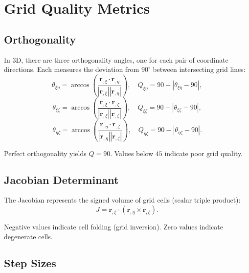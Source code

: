 \documentclass[11pt,a4paper]{report}
\newcommand{\rvec}{\bm{r}}
\begin{document}
\chapter{Grid Quality Metrics}

\section{Orthogonality}

In 3D, there are three orthogonality angles, one for each pair of coordinate directions. Each measures the deviation from $90^\circ$ between intersecting grid lines:
\begin{equation}
    \theta_{\xi\eta} = \arccos\left( \frac{\rvec_{,\xi} \cdot \rvec_{,\eta}}{|\rvec_{,\xi}| |\rvec_{,\eta}|} \right),
    \quad Q_{\xi\eta} = 90 - |\theta_{\xi\eta} - 90|,
\end{equation}
\begin{equation}
    \theta_{\xi\zeta} = \arccos\left( \frac{\rvec_{,\xi} \cdot \rvec_{,\zeta}}{|\rvec_{,\xi}| |\rvec_{,\zeta}|} \right),
    \quad Q_{\xi\zeta} = 90 - |\theta_{\xi\zeta} - 90|,
\end{equation}
\begin{equation}
    \theta_{\eta\zeta} = \arccos\left( \frac{\rvec_{,\eta} \cdot \rvec_{,\zeta}}{|\rvec_{,\eta}| |\rvec_{,\zeta}|} \right),
    \quad Q_{\eta\zeta} = 90 - |\theta_{\eta\zeta} - 90|.
\end{equation}

Perfect orthogonality yields $Q = 90$. Values below $45$ indicate poor grid quality.

\section{Jacobian Determinant}

The Jacobian represents the signed volume of grid cells (scalar triple product):
\begin{equation}
    J = \rvec_{,\xi} \cdot (\rvec_{,\eta} \times \rvec_{,\zeta}).
\end{equation}

Negative values indicate cell folding (grid inversion). Zero values indicate degenerate cells.

\section{Step Sizes}
\end{document}
